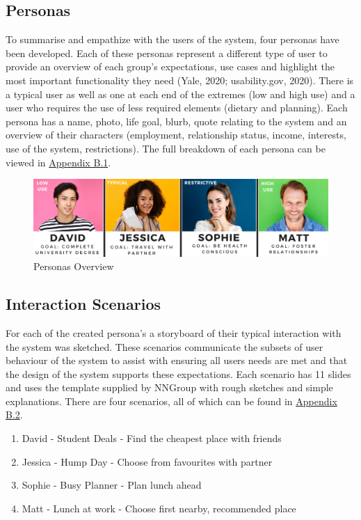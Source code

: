 \documentclass[a4 paper, 12pt]{article}
\begin{document}
    \subsection{Personas}
    To summarise and empathize with the users of the system, four personas have been developed. Each of these personas represent a different type of user to provide an overview of each group's expectations, use cases and highlight the most important functionality they need (Yale, 2020; usability.gov, 2020). There is a typical user as well as one at each end of the extremes (low and high use) and a user who requires the use of less required elements (dietary and planning). Each persona has a name, photo, life goal, blurb, quote relating to the system and an overview of their characters (employment, relationship status, income, interests, use of the system, restrictions). The full breakdown of each persona can be viewed in \hyperref[sec:B.1]{Appendix B.1}.
        \begin{figure} [H]
            \centering
            \includegraphics[width=\textwidth, frame]
                {./Med_Fidelity/Med_Report/images/personas_overview.PNG}  
            \caption{Personas Overview}
        \end{figure}  

    \subsection{Interaction Scenarios}
    For each of the created persona's a storyboard of their typical interaction with the system was sketched. These scenarios communicate the subsets of user behaviour of the system to assist with ensuring all users needs are met and that the design of the system supports these expectations. Each scenario has 11 slides and uses the template supplied by NNGroup with rough sketches and simple explanations. There are four scenarios, all of which can be found in \hyperref[sec:B.2]{Appendix B.2}.
        \begin{enumerate}
            \item David - Student Deals - Find the cheapest place with friends
            \item Jessica - Hump Day - Choose from favourites with partner
            \item Sophie - Busy Planner - Plan lunch ahead
            \item Matt - Lunch at work - Choose first nearby, recommended place
        \end{enumerate}
\end{document}

